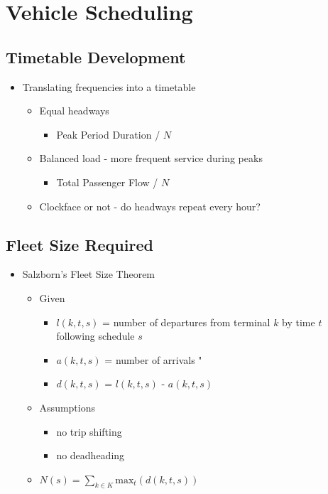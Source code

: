 \documentclass[11pt]{article}
\begin{document}
\section{Vehicle Scheduling}
\label{sec:org9ab0e22}

\subsection{Timetable Development}
\label{sec:org624607e}
\begin{itemize}
\item Translating frequencies into a timetable
\begin{itemize}
\item Equal headways
\begin{itemize}
\item Peak Period Duration / \(N\)
\end{itemize}
\item Balanced load - more frequent service during peaks
\begin{itemize}
\item Total Passenger Flow / \(N\)
\end{itemize}
\item Clockface or not - do headways repeat every hour?
\end{itemize}
\end{itemize}
\subsection{Fleet Size Required}
\label{sec:orge929f99}
\begin{itemize}
\item Salzborn's Fleet Size Theorem
\begin{itemize}
\item Given
\begin{itemize}
\item \(l(k,t,s)\) = number of departures from terminal \(k\) by time \(t\) following schedule \(s\)
\item \(a(k,t,s)\) = number of arrivals "
\item \(d(k,t,s)\) = \(l(k,t,s)\) - \(a(k,t,s)\)
\end{itemize}
\item Assumptions
\begin{itemize}
\item no trip shifting
\item no deadheading
\end{itemize}
\item \(N(s) = \sum_{k \in K} \text{max}_t(d(k,t,s))\)
\end{itemize}
\end{itemize}
\end{document}
